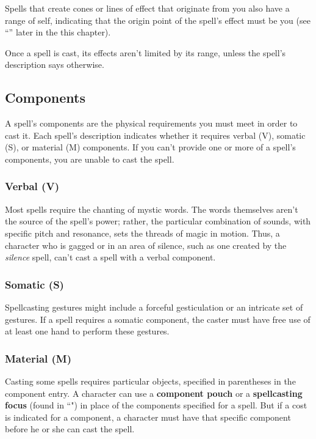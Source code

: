 Spells that create cones or lines of effect that originate from you also have a range of self, indicating that the origin point of the spell's effect must be you (see “” later in the this chapter).

Once a spell is cast, its effects aren't limited by its range, unless the spell's description says otherwise.

\subsection{Components}

A spell's components are the physical requirements you must meet in order to cast it. Each spell's description indicates whether it requires verbal (V), somatic (S), or material (M) components. If you can't provide one or more of a spell's components, you are unable to cast the spell.

\subsubsection{Verbal (V)}

Most spells require the chanting of mystic words. The words themselves aren't the source of the spell's power; rather, the particular combination of sounds, with specific pitch and resonance, sets the threads of magic in motion. Thus, a character who is gagged or in an area of silence, such as one created by the \textit{silence} spell, can't cast a spell with a verbal component.

\subsubsection{Somatic (S)}

Spellcasting gestures might include a forceful gesticulation or an intricate set of gestures. If a spell requires a somatic component, the caster must have free use of at least one hand to perform these gestures.

\subsubsection{Material (M)}

Casting some spells requires particular objects, specified in parentheses in the component entry. A character can use a \textbf{component pouch} or a \textbf{spellcasting focus} (found in “") in place of the components specified for a spell. But if a cost is indicated for a component, a character must have that specific component before he or she can cast the spell.

